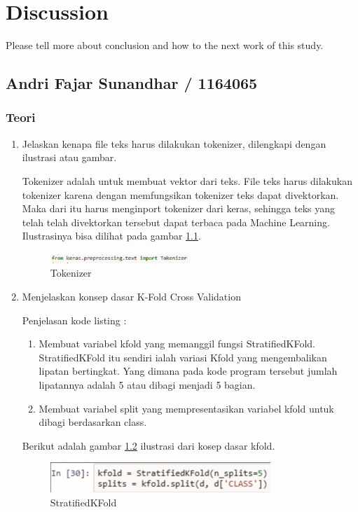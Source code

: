 \chapter{Discussion}
Please tell more about conclusion and how to the next work of this study.

\section{Andri Fajar Sunandhar / 1164065}
\subsection{Teori}
\begin{enumerate}

\item Jelaskan kenapa file teks harus dilakukan tokenizer, dilengkapi dengan ilustrasi atau gambar.
	\par Tokenizer adalah untuk membuat vektor dari teks. File teks harus dilakukan tokenizer karena dengan memfungsikan tokenizer teks dapat divektorkan. Maka dari itu harus menginport tokenizer dari keras, sehingga teks yang telah telah divektorkan tersebut dapat terbaca pada Machine Learning. Ilustrasinya bisa dilihat pada gambar \ref{no1}.
	\begin{figure}[ht]
	\centerline{\includegraphics[width=0.5\textwidth]{figures/chapter7/no1.jpg}}
	\caption{Tokenizer}
	\label{no1}
	\end{figure}

\item Menjelaskan konsep dasar K-Fold Cross Validation
	
	\par Penjelasan kode listing :
	\begin{enumerate}
	\item Membuat variabel kfold yang memanggil fungsi StratifiedKFold. StratifiedKFold itu sendiri ialah variasi Kfold yang mengembalikan lipatan bertingkat. Yang dimana pada kode program tersebut jumlah lipatannya adalah 5 atau dibagi menjadi 5 bagian.
	\item Membuat variabel split yang mempresentasikan variabel kfold untuk dibagi berdasarkan class.
	\end{enumerate}
	
	\par Berikut adalah gambar  \ref{A2} ilustrasi dari kosep dasar kfold.
		\begin{figure}[!hbtp]
		\centering
		\includegraphics[scale=0.4]{figures/chapter7/no2.jpg}
		\caption{StratifiedKFold}
		\label{A2}
		\end{figure}


\end{enumerate}
